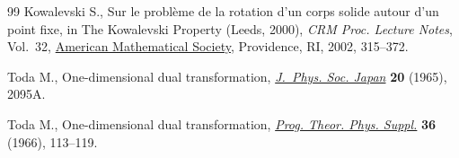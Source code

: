 \begin{thebibliography}{99}
Kowalevski S., Sur le probl\`eme de la rotation d'un corps solide autour d'un
 point fixe, in The {K}owalevski {P}roperty ({L}eeds, 2000), \textit{CRM Proc.
 Lecture Notes}, Vol.~32, \href{https://doi.org/10.1090/crmp/032/18}{American Mathematical Society}, Providence, RI, 2002,
 315--372.

Toda M., One-dimensional dual transformation, \href{https://doi.org/10.1143/JPSJ.20.2095A}{\textit{J.~Phys. Soc. Japan}}
 \textbf{20} (1965), 2095A.

Toda M., One-dimensional dual transformation, \href{https://doi.org/10.1143/PTPS.36.113}{\textit{Prog. Theor. Phys.
 Suppl.}} \textbf{36} (1966), 113--119.

\end{thebibliography}
